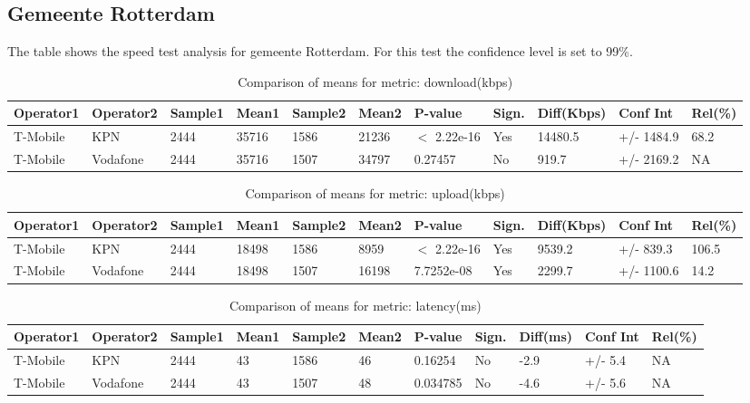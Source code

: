 \documentclass[]{article}
\begin{document}
\normalsize

\newpage

\subsection{Gemeente Rotterdam}\label{gemeente-rotterdam}

The table shows the speed test analysis for gemeente Rotterdam. For this
test the confidence level is set to 99\%.

\begin{table}[ht]
\centering
{\footnotesize
\begin{tabular}{lllllllllll}
  \hline
Operator1 & Operator2 & Sample1 & Mean1 & Sample2 & Mean2 & P-value & Sign. & Diff(Kbps) & Conf Int & Rel(\%) \\ 
  \hline
T-Mobile & KPN & 2444 & 35716 & 1586 & 21236 & $<$ 2.22e-16 & Yes & 14480.5 & +/- 1484.9 & 68.2 \\ 
  T-Mobile & Vodafone & 2444 & 35716 & 1507 & 34797 & 0.27457 & No & 919.7 & +/- 2169.2 & NA \\ 
   \hline
\end{tabular}
}
\caption{Comparison of means for metric: download(kbps)} 
\end{table}

\begin{table}[ht]
\centering
{\footnotesize
\begin{tabular}{lllllllllll}
  \hline
Operator1 & Operator2 & Sample1 & Mean1 & Sample2 & Mean2 & P-value & Sign. & Diff(Kbps) & Conf Int & Rel(\%) \\ 
  \hline
T-Mobile & KPN & 2444 & 18498 & 1586 & 8959 & $<$ 2.22e-16 & Yes & 9539.2 & +/- 839.3 & 106.5 \\ 
  T-Mobile & Vodafone & 2444 & 18498 & 1507 & 16198 & 7.7252e-08 & Yes & 2299.7 & +/- 1100.6 & 14.2 \\ 
   \hline
\end{tabular}
}
\caption{Comparison of means for metric: upload(kbps)} 
\end{table}

\begin{table}[ht]
\centering
{\footnotesize
\begin{tabular}{lllllllllll}
  \hline
Operator1 & Operator2 & Sample1 & Mean1 & Sample2 & Mean2 & P-value & Sign. & Diff(ms) & Conf Int & Rel(\%) \\ 
  \hline
T-Mobile & KPN & 2444 & 43 & 1586 & 46 & 0.16254 & No & -2.9 & +/- 5.4 & NA \\ 
  T-Mobile & Vodafone & 2444 & 43 & 1507 & 48 & 0.034785 & No & -4.6 & +/- 5.6 & NA \\ 
   \hline
\end{tabular}
}
\caption{Comparison of means for metric: latency(ms)} 
\end{table}
\end{document}
